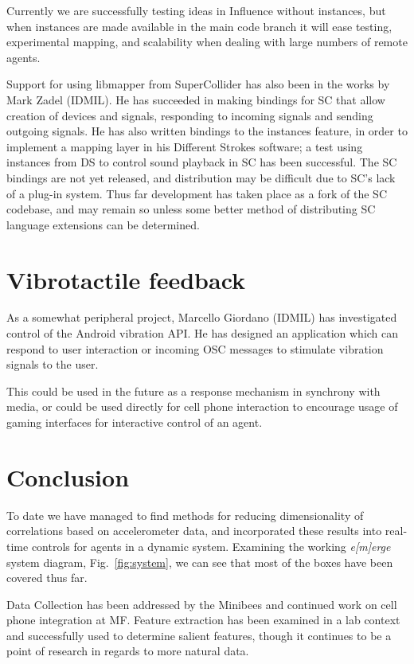 \documentclass{article}
\newcommand{\emerge}{\emph{e[m]erge}\xspace}
\begin{document}
Currently we are successfully testing ideas in Influence without
instances, but when instances are made available in the main code
branch it will ease testing, experimental mapping, and scalability
when dealing with large numbers of remote agents.

Support for using libmapper from SuperCollider has also been in the
works by Mark Zadel (IDMIL).
He has succeeded in making bindings for SC that allow creation of
devices and signals, responding to incoming signals and sending
outgoing signals.
He has also written bindings to the instances feature, in order to
implement a mapping layer in his Different Strokes software; a test
using instances from DS to control sound playback in SC has been
successful.
The SC bindings are not yet released, and distribution may be
difficult due to SC's lack of a plug-in system.
Thus far development has taken place as a fork of the SC codebase, and
may remain so unless some better method of distributing SC language
extensions can be determined.

\section{Vibrotactile feedback}

As a somewhat peripheral project, Marcello Giordano (IDMIL) has
investigated control of the Android vibration API.
He has designed an application which can respond to user interaction
or incoming OSC messages to stimulate vibration signals to the user.

This could be used in the future as a response mechanism in synchrony
with media, or could be used directly for cell phone interaction to
encourage usage of gaming interfaces for interactive control of an
agent.

\section{Conclusion}

To date we have managed to find methods for reducing dimensionality of
correlations based on accelerometer data, and incorporated these
results into real-time controls for agents in a dynamic system.
Examining the working \emerge system diagram, Fig.~\ref{fig:system},
we can see that most of the boxes have been covered thus far.

Data Collection has been addressed by the Minibees and continued work
on cell phone integration at MF.
Feature extraction has been examined in a lab context and successfully
used to determine salient features, though it continues to be a point
of research in regards to more natural data.
\end{document}
